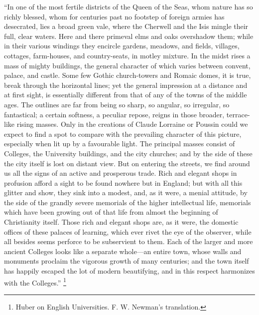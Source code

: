 ``In one of the most fertile districts of the Queen of the
Seas, whom nature has so richly blessed, whom for centuries past no
footstep of foreign armies has desecrated, lies a broad green vale,
where the Cherwell and the Isis mingle their full, clear waters.
Here and there primeval elms and oaks overshadow them; while in their
various windings they encircle gardens, meadows, and fields, villages,
cottages, farm-houses, and country-seats, in motley mixture. In the
midst rises a mass of mighty buildings, the general character of which
varies between convent, palace, and castle. Some few Gothic
church-towers and Romaic domes, it is true, break through the
horizontal lines; yet the general impression at a distance and at
first sight, is essentially different from that of any of the towns of
the middle ages. The outlines are far from being so sharp, so angular,
so irregular, so fantastical; a certain softness, a peculiar repose,
reigns in those broader, terrace-like rising masses. Only in the
creations of Claude Lorraine or Poussin could we expect to find a spot
to compare with the prevailing character of this picture, especially
when lit up by a favourable light. The principal masses consist of
Colleges, the University buildings, and the city churches; and by the
side of these the city itself is lost on distant view. But on entering
the streets, we find around us all the signs of an active and
prosperous trade. Rich and elegant shops in profusion afford a sight
to be found nowhere but in England; but with all this glitter and
show, they sink into a modest, and, as it were, a menial attitude, by
the side of the grandly severe memorials of the higher intellectual
life, memorials which have been growing out of that life from almost
the beginning of Christianity itself. Those rich and elegant shops
are, as it were, the domestic offices of these palaces of learning,
which ever rivet the eye of the observer, while all besides seems
perforce to be subservient to them. Each of the larger and more
ancient Colleges looks like a separate whole—an entire town, whose
walls and monuments proclaim the vigorous growth of many
centuries; and the town itself has happily escaped the lot of modern
beautifying, and in this respect harmonizes with the Colleges.'' \footnote{Huber on English Universities. F. W. Newman's translation.}

